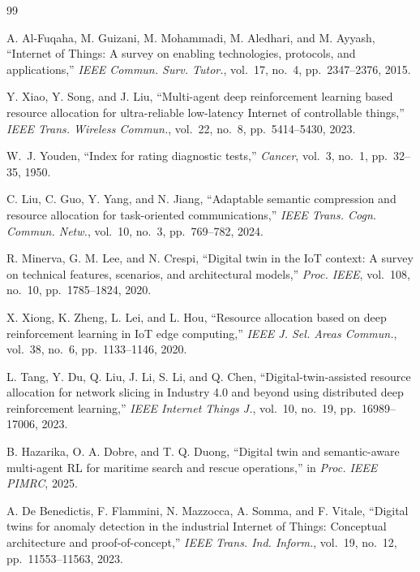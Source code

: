 \documentclass[conference]{IEEEtran}
\begin{document}
\begin{thebibliography}{99}

A. Al-Fuqaha, M. Guizani, M. Mohammadi, M. Aledhari, and M. Ayyash,
``Internet of Things: A survey on enabling technologies, protocols, and
applications,''
\textit{IEEE Commun. Surv. Tutor.}, vol.~17, no.~4, pp.~2347--2376, 2015.

Y. Xiao, Y. Song, and J. Liu,
``Multi-agent deep reinforcement learning based resource allocation for ultra-reliable low-latency Internet of controllable things,''
\textit{IEEE Trans. Wireless Commun.}, vol.~22, no.~8, pp.~5414--5430, 2023.

W.~J. Youden,
``Index for rating diagnostic tests,''
\textit{Cancer}, vol.~3, no.~1, pp.~32--35, 1950.

C. Liu, C. Guo, Y. Yang, and N. Jiang,
``Adaptable semantic compression and resource allocation for
task-oriented communications,''
\textit{IEEE Trans. Cogn. Commun. Netw.}, vol.~10, no.~3,
pp.~769--782, 2024.

R. Minerva, G. M. Lee, and N. Crespi,
``Digital twin in the IoT context: A survey on technical features,
scenarios, and architectural models,''
\textit{Proc. IEEE}, vol.~108, no.~10, pp.~1785--1824, 2020.

X. Xiong, K. Zheng, L. Lei, and L. Hou,
``Resource allocation based on deep reinforcement learning in IoT edge
computing,''
\textit{IEEE J. Sel. Areas Commun.}, vol.~38, no.~6,
pp.~1133--1146, 2020.

L. Tang, Y. Du, Q. Liu, J. Li, S. Li, and Q. Chen,
``Digital-twin-assisted resource allocation for network slicing in
Industry 4.0 and beyond using distributed deep reinforcement learning,''
\textit{IEEE Internet Things J.}, vol.~10, no.~19,
pp.~16989--17006, 2023.

B. Hazarika, O. A. Dobre, and T. Q. Duong,
``Digital twin and semantic-aware multi-agent RL for maritime search
and rescue operations,''
in \textit{Proc. IEEE PIMRC}, 2025.

A. De Benedictis, F. Flammini, N. Mazzocca, A. Somma, and F. Vitale,
``Digital twins for anomaly detection in the industrial Internet of
Things: Conceptual architecture and proof-of-concept,''
\textit{IEEE Trans. Ind. Inform.}, vol.~19, no.~12,
pp.~11553--11563, 2023.


\end{thebibliography}
\end{document}

